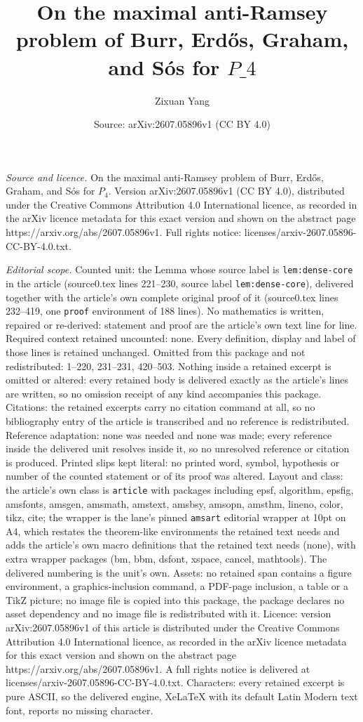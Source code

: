 \documentclass[10pt,a4paper]{amsart}
\title[On the maximal anti-Ramsey problem of Burr, Erd\H{o}s, Graha]{On the maximal anti-Ramsey problem of Burr, Erd\H{o}s, Graham, and S\'{o}s for $P\_4$}
\author{Zixuan Yang}
\date{Source: arXiv:2607.05896v1 (CC BY 4.0)}
\begin{document}
\maketitle

\noindent\emph{Source and licence.} On the maximal anti-Ramsey problem of Burr, Erd\H{o}s, Graham, and S\'{o}s for $P_4$. Version arXiv:2607.05896v1 (CC BY 4.0), distributed under the Creative Commons Attribution 4.0 International licence, as recorded in the arXiv licence metadata for this exact version and shown on the abstract page https://arxiv.org/abs/2607.05896v1. Full rights notice: licenses/arxiv-2607.05896-CC-BY-4.0.txt.\par\smallskip

\noindent\textit{Editorial scope.} Counted unit: the Lemma whose source label is \texttt{lem:dense-core} in the article (source0.tex lines 221--230, source label \texttt{lem:dense-core}), delivered together with the article's own complete original proof of it (source0.tex lines 232--419, one \texttt{proof} environment of 188 lines). No mathematics is written, repaired or re-derived: statement and proof are the article's own text line for line. Required context retained uncounted: none. Every definition, display and label of those lines is retained unchanged. Omitted from this package and not redistributed: 1--220, 231--231, 420--503. Nothing inside a retained excerpt is omitted or altered: every retained body is delivered exactly as the article's lines are written, so no omission receipt of any kind accompanies this package. Citations: the retained excerpts carry no citation command at all, so no bibliography entry of the article is transcribed and no reference is redistributed. Reference adaptation: none was needed and none was made; every reference inside the delivered unit resolves inside it, so no unresolved reference or citation is produced. Printed slips kept literal: no printed word, symbol, hypothesis or number of the counted statement or of its proof was altered. Layout and class: the article's own class is \texttt{article} with packages including epsf, algorithm, epsfig, amsfonts, amsgen, amsmath, amstext, amsbsy, amsopn, amsthm, lineno, color, tikz, cite; the wrapper is the lane's pinned \texttt{amsart} editorial wrapper at 10pt on A4, which restates the theorem-like environments the retained text needs and adds the article's own macro definitions that the retained text needs (none), with extra wrapper packages (bm, bbm, dsfont, xspace, cancel, mathtools). The delivered numbering is the unit's own. Assets: no retained span contains a figure environment, a graphics-inclusion command, a PDF-page inclusion, a table or a TikZ picture; no image file is copied into this package, the package declares no asset dependency and no image file is redistributed with it. Licence: version arXiv:2607.05896v1 of this article is distributed under the Creative Commons Attribution 4.0 International licence, as recorded in the arXiv licence metadata for this exact version and shown on the abstract page https://arxiv.org/abs/2607.05896v1. A full rights notice is delivered at licenses/arxiv-2607.05896-CC-BY-4.0.txt. Characters: every retained excerpt is pure ASCII, so the delivered engine, XeLaTeX with its default Latin Modern text font, reports no missing character.
\end{document}
